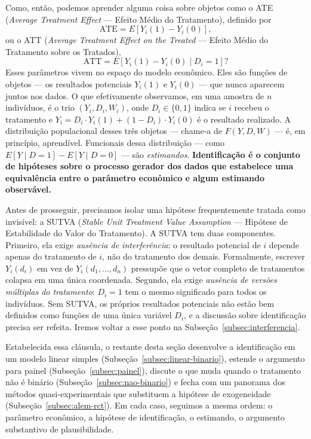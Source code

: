 Como, então, podemos aprender alguma coisa sobre objetos como o ATE (\textit{Average Treatment Effect} --- Efeito Médio do Tratamento), definido por
\begin{equation}
\text{ATE} = E[Y_i(1) - Y_i(0)],
\label{eq:ate}
\end{equation}
ou o ATT (\textit{Average Treatment Effect on the Treated} --- Efeito Médio do Tratamento sobre os Tratados),
\begin{equation}
\text{ATT} = E[Y_i(1) - Y_i(0) \mid D_i = 1]?
\label{eq:att}
\end{equation}
Esses parâmetros vivem no espaço do modelo econômico. Eles são funções de objetos --- os resultados potenciais $Y_i(1)$ e $Y_i(0)$ --- que nunca aparecem juntos nos dados. O que efetivamente observamos, em uma amostra de $n$ indivíduos, é o trio $(Y_i, D_i, W_i)$, onde $D_i \in \{0,1\}$ indica se $i$ recebeu o tratamento e $Y_i = D_i \cdot Y_i(1) + (1 - D_i) \cdot Y_i(0)$ é o resultado realizado. A distribuição populacional desses três objetos --- chame-a de $F(Y, D, W)$ --- é, em princípio, aprendível. Funcionais dessa distribuição --- como $E[Y \mid D=1] - E[Y \mid D=0]$ --- são \textit{estimandos}. \textbf{Identificação é o conjunto de hipóteses sobre o processo gerador dos dados que estabelece uma equivalência entre o parâmetro econômico e algum estimando observável.}

Antes de prosseguir, precisamos isolar uma hipótese frequentemente tratada como invisível: a SUTVA (\textit{Stable Unit Treatment Value Assumption} --- Hipótese de Estabilidade do Valor do Tratamento). A SUTVA tem duas componentes. Primeiro, ela exige \textit{ausência de interferência}: o resultado potencial de $i$ depende apenas do tratamento de $i$, não do tratamento dos demais. Formalmente, escrever $Y_i(d_i)$ em vez de $Y_i(d_1, \dots, d_n)$ pressupõe que o vetor completo de tratamentos colapsa em uma única coordenada. Segundo, ela exige \textit{ausência de versões múltiplas do tratamento}: $D_i = 1$ tem o mesmo significado para todos os indivíduos. Sem SUTVA, os próprios resultados potenciais não estão bem definidos como funções de uma única variável $D_i$, e a discussão sobre identificação precisa ser refeita. Iremos voltar a esse ponto na Subseção~\ref{subsec:interferencia}.

Estabelecida essa cláusula, o restante desta seção desenvolve a identificação em um modelo linear simples (Subseção~\ref{subsec:linear-binario}), estende o argumento para painel (Subseção~\ref{subsec:painel}), discute o que muda quando o tratamento não é binário (Subseção~\ref{subsec:nao-binario}) e fecha com um panorama dos métodos quasi-experimentais que substituem a hipótese de exogeneidade (Subseção~\ref{subsec:alem-rct}). Em cada caso, seguimos a mesma ordem: o parâmetro econômico, a hipótese de identificação, o estimando, o argumento substantivo de plausibilidade.

